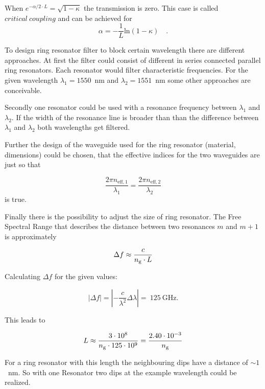When $e^{-\alpha /2\cdot L} = \sqrt{1-\kappa}$ the transmission is zero. This case is called $critical~coupling$ and can be achieved for 
\begin{equation}
\alpha = - \frac{1}{L}\mathrm{ln}(1-\kappa)\quad .
\label{eq:crti}
\end{equation}


To design ring resonator filter to block certain wavelength there are different approaches.
At first the filter could consist of different in series connected parallel ring resonators. Each resonator would filter characteristic frequencies.
For the given wavelength $\lambda_1 = 1550$~nm and $\lambda_2 = 1551$~nm some other approaches are conceivable.

Secondly one resonator could be used with a resonance frequency between $\lambda_1$ and $\lambda_2$. If the width of the resonance line is broader than than the difference between $\lambda_1$ and $\lambda_2$ both wavelengths get filtered.

Further the design of the waveguide used for the ring resonator (material, dimensions) could be chosen, that the effective indices for the two waveguides are just so that 

\begin{equation}
\frac{2\pi n_{\mathrm{eff,1}}}{\lambda_1} = \frac{2\pi n_{\mathrm{eff,2}}}{\lambda_2}
\label{eq:}
\end{equation}
is true.

Finally there is the possibility to adjust the size of ring resonator. The Free Spectral Range that describes the distance between two resonances $m$ and $m+1$ is approximately

\begin{equation}
\Delta f \approx \frac{c}{n_{\mathrm{g}}\cdot L}
\label{eq:abstand}
\end{equation}

Calculating $\Delta f$ for the given values:

\begin{equation}
|\Delta f| = \left|-\frac{c}{\lambda^2}\Delta\lambda\right| =~125~\mathrm{GHz}.
\label{eq:}
\end{equation}

This leads to 

\begin{equation}
L \approx \frac{3\cdot10^8}{n_{\mathrm{g}}\cdot125\cdot10^9}=\frac{2.40\cdot10^{-3}}{n_{\mathrm{g}}}
\label{eq:}
\end{equation}

For a ring resonator with this length the neighbouring dips have a distance of $\sim1$~nm. So with one Resonator two dips at the example wavelength could be realized.

